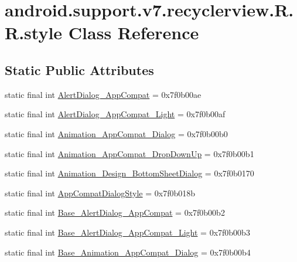 \hypertarget{classandroid_1_1support_1_1v7_1_1recyclerview_1_1_r_1_1style}{
\section{android.support.v7.recyclerview.R.R.style Class Reference}
\label{classandroid_1_1support_1_1v7_1_1recyclerview_1_1_r_1_1style}
}
\subsection*{Static Public Attributes}
\begin{CompactItemize}
\item 
static final int \hyperlink{classandroid_1_1support_1_1v7_1_1recyclerview_1_1_r_1_1style_336e1c17b382df3a70eeb6d16eacc2d7}{AlertDialog\_\-AppCompat} = 0x7f0b00ae
\item 
static final int \hyperlink{classandroid_1_1support_1_1v7_1_1recyclerview_1_1_r_1_1style_971051b19882505dcc5ae22f858a5225}{AlertDialog\_\-AppCompat\_\-Light} = 0x7f0b00af
\item 
static final int \hyperlink{classandroid_1_1support_1_1v7_1_1recyclerview_1_1_r_1_1style_204d621359a1c8198652f93fc291a416}{Animation\_\-AppCompat\_\-Dialog} = 0x7f0b00b0
\item 
static final int \hyperlink{classandroid_1_1support_1_1v7_1_1recyclerview_1_1_r_1_1style_2d4accb3ce45c28b65e5fa945996e552}{Animation\_\-AppCompat\_\-DropDownUp} = 0x7f0b00b1
\item 
static final int \hyperlink{classandroid_1_1support_1_1v7_1_1recyclerview_1_1_r_1_1style_6a02575f3160466a268ee23429d0205c}{Animation\_\-Design\_\-BottomSheetDialog} = 0x7f0b0170
\item 
static final int \hyperlink{classandroid_1_1support_1_1v7_1_1recyclerview_1_1_r_1_1style_57058733d446b3414096ad75c17bccde}{AppCompatDialogStyle} = 0x7f0b018b
\item 
static final int \hyperlink{classandroid_1_1support_1_1v7_1_1recyclerview_1_1_r_1_1style_0e06a487f6a23821a95c03414ba8ef40}{Base\_\-AlertDialog\_\-AppCompat} = 0x7f0b00b2
\item 
static final int \hyperlink{classandroid_1_1support_1_1v7_1_1recyclerview_1_1_r_1_1style_4314ea9653c1cfbadd7ae517f203323b}{Base\_\-AlertDialog\_\-AppCompat\_\-Light} = 0x7f0b00b3
\item 
static final int \hyperlink{classandroid_1_1support_1_1v7_1_1recyclerview_1_1_r_1_1style_e11296265db299170d1783a20ec7309a}{Base\_\-Animation\_\-AppCompat\_\-Dialog} = 0x7f0b00b4

\end{CompactItemize}
